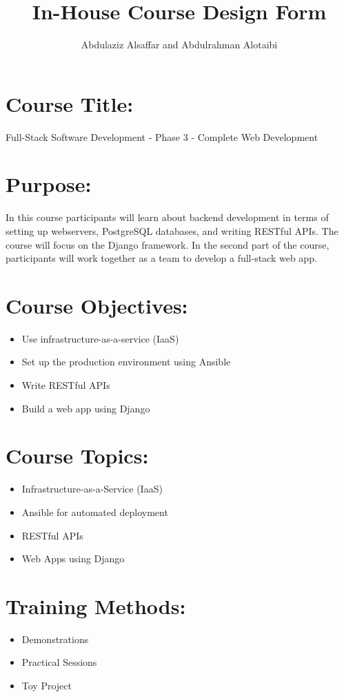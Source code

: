 \documentclass[a4paper,11pt]{article}
\author{Abdulaziz Alsa{f}far and Abdulrahman Alotaibi}
\title{In-House Course Design Form}
\begin{document}
\maketitle
\pagestyle{plain}
\setcounter{page}{1}

\section{Course Title:}
Full-Stack Software Development - Phase 3 - Complete Web Development

\section{Purpose:}
In this course participants will learn about backend development in terms of setting up webservers, PostgreSQL databases, and writing RESTful APIs. The course will focus on the Django framework. In the second part of the course, participants will work together as a team to develop a full-stack web app.

\section{Course Objectives:}
\begin{itemize}
	\item Use infrastructure-as-a-service (IaaS)
	\item Set up the production environment using Ansible
	\item Write RESTful APIs
	\item Build a web app using Django	
\end{itemize}

\section{Course Topics:}
\begin{itemize}
	\item Infrastructure-as-a-Service (IaaS)
	\item Ansible for automated deployment
	\item RESTful APIs
	\item Web Apps using Django
\end{itemize}

\section{Training Methods:}
\begin{itemize}
	\item Demonstrations
	\item Practical Sessions
	\item Toy Project
\end{itemize}
\end{document}
